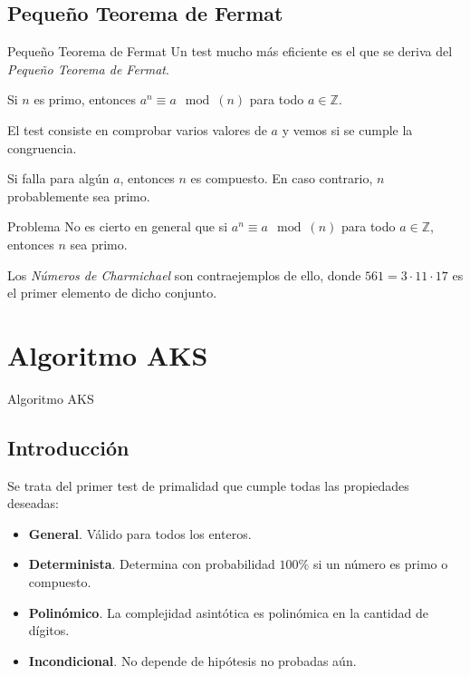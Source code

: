 \documentclass{beamer}
\begin{document}
\subsection{Pequeño Teorema de Fermat}

\begin{frame}{Pequeño Teorema de Fermat}
	\onslide<1->Un test mucho más eficiente es el que se deriva del \textit{Pequeño Teorema de Fermat}.\break
	
	\begin{theorem}
		Si $n$ es primo, entonces $a^n \equiv a \mod(n)$ para todo $a \in \mathbb{Z}$.
	\end{theorem}
	
	El test consiste en comprobar varios valores de $a$ y vemos si se cumple la congruencia.\break
	
	Si falla para algún $a$, entonces $n$ es compuesto. En caso contrario, $n$ probablemente sea primo.
\end{frame}

\begin{frame}{Problema}
	\onslide<1->No es cierto en general que si $a^n \equiv a \mod(n)$ para todo $a \in \mathbb{Z}$, entonces $n$ sea primo.\break
	
	Los \textit{Números de Charmichael} son contraejemplos de ello, donde $561 = 3\cdot11\cdot17$ es el primer elemento de dicho conjunto.
\end{frame}

\section{Algoritmo AKS}

\begin{frame}
	\centering
	\begin{Huge}
		Algoritmo AKS
	\end{Huge}
\end{frame}

\subsection{Introducción}

\begin{frame}
	Se trata del primer test de primalidad que cumple todas las propiedades deseadas:\break
	
	\begin{itemize}[<+(1)->]
		\item \textbf{General}. Válido para todos los enteros.
		
		\item \textbf{Determinista}. Determina con probabilidad $100\%$ si un número es primo o compuesto.
		
		\item \textbf{Polinómico}. La complejidad asintótica es polinómica en la cantidad de dígitos.
		
		\item \textbf{Incondicional}. No depende de hipótesis no probadas aún.
	\end{itemize}
\end{frame}
\end{document}
